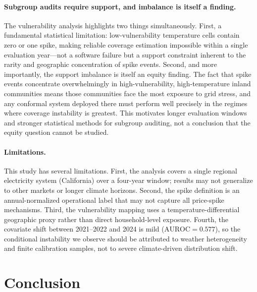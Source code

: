 \documentclass{article}
\begin{document}
\paragraph{Subgroup audits require support, and imbalance is itself a finding.}
The vulnerability analysis highlights two things simultaneously. First, a
fundamental statistical limitation: low-vulnerability temperature cells contain
zero or one spike, making reliable coverage estimation impossible within a
single evaluation year---not a software failure but a support constraint
inherent to the rarity and geographic concentration of spike events. Second,
and more importantly, the support imbalance is itself an equity finding. The
fact that spike events concentrate overwhelmingly in high-vulnerability,
high-temperature inland communities means those communities face the most
exposure to grid stress, and any conformal system deployed there must perform
well precisely in the regimes where coverage instability is greatest. This
motivates longer evaluation windows and stronger statistical methods for
subgroup auditing, not a conclusion that the equity question cannot be studied.

\paragraph{Limitations.}
This study has several limitations. First, the analysis covers a single
regional electricity system (California) over a four-year window; results
may not generalize to other markets or longer climate horizons. Second, the
spike definition is an annual-normalized operational label that may not
capture all price-spike mechanisms. Third, the vulnerability mapping uses
a temperature-differential geographic proxy rather than direct household-level
exposure. Fourth, the covariate shift between 2021--2022 and 2024 is mild
($\text{AUROC}=0.577$), so the conditional instability we observe should be
attributed to weather heterogeneity and finite calibration samples, not to
severe climate-driven distribution shift.

\section{Conclusion}
\label{sec:conclusion}
\end{document}
